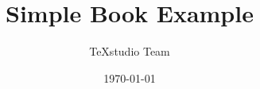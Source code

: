 \documentclass[a4paper,12pt]{book}
\begin{document}
\author{TeXstudio Team}
\title{Simple Book Example}
\date{\today}

\frontmatter
\maketitle
\tableofcontents

\mainmatter






\backmatter


\end{document}

